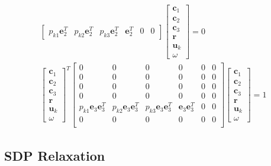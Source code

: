 \documentclass{article}
\begin{document}
\begin{align}
\begin{bmatrix}
        p_{k1}\mathbf{e}_2^T & p_{k2}\mathbf{e}_2^T & p_{k3}\mathbf{e}_2^T & \mathbf{e}_2^T & 0 &0 
    \end{bmatrix} 
    \begin{bmatrix}
        \mathbf{c}_1 \\
        \mathbf{c}_2 \\
        \mathbf{c}_3 \\
        \mathbf{r} \\
        \mathbf{u}_k \\
        \omega
    \end{bmatrix} = 0 \\
    \begin{bmatrix}
        \mathbf{c}_1 \\
        \mathbf{c}_2 \\
        \mathbf{c}_3 \\
        \mathbf{r} \\
        \mathbf{u}_k \\
        \omega
    \end{bmatrix}^T
    \begin{bmatrix}
        0 & 0 & 0 & 0 & 0 & 0 \\
        0 & 0 & 0 & 0 & 0 & 0 \\
        0 & 0 & 0 & 0 & 0 & 0 \\
        0 & 0 & 0 & 0 & 0 & 0 \\
        p_{k1}\mathbf{e}_3\mathbf{e}_3^T & p_{k2}\mathbf{e}_3\mathbf{e}_3^T & p_{k3}\mathbf{e}_3\mathbf{e}_3^T & \mathbf{e}_3\mathbf{e}_3^T & 0 & 0 \\
        0 & 0 & 0 & 0 & 0 & 0 \\
    \end{bmatrix} 
    \begin{bmatrix}
        \mathbf{c}_1 \\
        \mathbf{c}_2 \\
        \mathbf{c}_3 \\
        \mathbf{r} \\
        \mathbf{u}_k \\
        \omega
    \end{bmatrix} = 1 
\end{align}

\subsection{SDP Relaxation}
\end{document}
